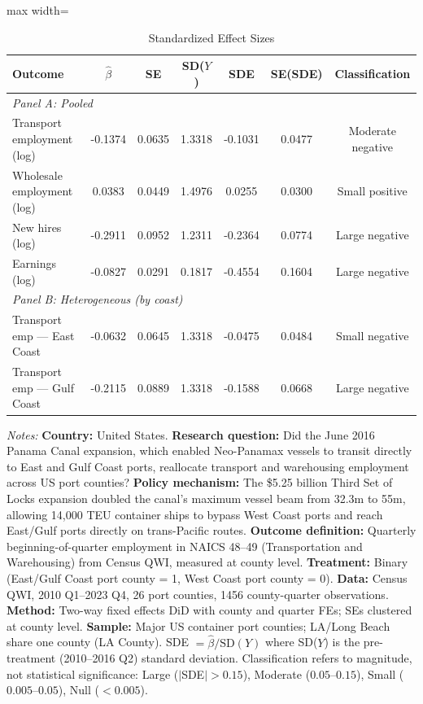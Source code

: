 \begin{table}[htbp]
\centering
\caption{Standardized Effect Sizes}
\label{tab:sde}
\begin{adjustbox}{max width=\textwidth}
\begin{tabular}{lcccccc}
\hline\hline
Outcome & $\hat{\beta}$ & SE & SD($Y$) & SDE & SE(SDE) & Classification \\
\hline
\multicolumn{7}{l}{\textit{Panel A: Pooled}} \\
Transport employment (log) & -0.1374 & 0.0635 & 1.3318 & -0.1031 & 0.0477 & Moderate negative \\
Wholesale employment (log) & 0.0383 & 0.0449 & 1.4976 & 0.0255 & 0.0300 & Small positive \\
New hires (log) & -0.2911 & 0.0952 & 1.2311 & -0.2364 & 0.0774 & Large negative \\
Earnings (log) & -0.0827 & 0.0291 & 0.1817 & -0.4554 & 0.1604 & Large negative \\
\hline
\multicolumn{7}{l}{\textit{Panel B: Heterogeneous (by coast)}} \\
Transport emp --- East Coast & -0.0632 & 0.0645 & 1.3318 & -0.0475 & 0.0484 & Small negative \\
Transport emp --- Gulf Coast & -0.2115 & 0.0889 & 1.3318 & -0.1588 & 0.0668 & Large negative \\
\hline\hline
\end{tabular}
\end{adjustbox}
\begin{tablenotes}[flushleft]
\small
\item \textit{Notes:} \textbf{Country:} United States. \textbf{Research question:} Did the June 2016 Panama Canal expansion, which enabled Neo-Panamax vessels to transit directly to East and Gulf Coast ports, reallocate transport and warehousing employment across US port counties? \textbf{Policy mechanism:} The \$5.25 billion Third Set of Locks expansion doubled the canal's maximum vessel beam from 32.3m to 55m, allowing 14,000 TEU container ships to bypass West Coast ports and reach East/Gulf ports directly on trans-Pacific routes. \textbf{Outcome definition:} Quarterly beginning-of-quarter employment in NAICS 48--49 (Transportation and Warehousing) from Census QWI, measured at county level. \textbf{Treatment:} Binary (East/Gulf Coast port county = 1, West Coast port county = 0). \textbf{Data:} Census QWI, 2010 Q1--2023 Q4, 26 port counties, 1456 county-quarter observations. \textbf{Method:} Two-way fixed effects DiD with county and quarter FEs; SEs clustered at county level. \textbf{Sample:} Major US container port counties; LA/Long Beach share one county (LA County). SDE $= \hat{\beta} / \text{SD}(Y)$ where SD($Y$) is the pre-treatment (2010--2016 Q2) standard deviation. Classification refers to magnitude, not statistical significance: Large ($|$SDE$| > 0.15$), Moderate ($0.05$--$0.15$), Small ($0.005$--$0.05$), Null ($< 0.005$).
\end{tablenotes}
\end{table}

